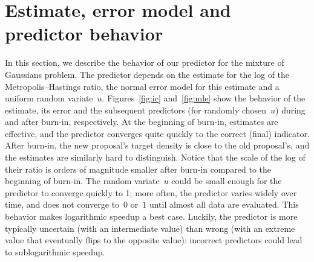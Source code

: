 \documentclass[angelino.tex]{subfiles}
\begin{document}
\section{Estimate, error model and predictor behavior}
\label{sec:predictor-behavior}

In this section, we describe the behavior of our predictor
for the mixture of Gaussians problem.
The predictor depends on the estimate for the log of the Metropolis--Hastings
ratio, the normal error model for this estimate and a uniform random variate~$u$.
Figures~\ref{fig:ic} and~\ref{fig:mle} show the behavior of the estimate,
its error and the subsequent predictors (for randomly chosen~$u$)
during and after burn-in, respectively.
%
At the beginning of burn-in, estimates are effective, and the predictor
converges quite quickly to the correct (final) indicator.
After burn-in, the new proposal's target density is close to the old proposal's,
and the estimates are similarly hard to distinguish.
%
Notice that the scale of the log of their ratio is orders of magnitude smaller
after burn-in compared to the beginning of burn-in.
The random variate~$u$ could be small enough for the predictor to
converge quickly to 1; more often, the predictor varies widely over time,
and does not converge to~$0$ or~$1$ until almost all data are evaluated.
This behavior makes logarithmic speedup a best case.
Luckily, the predictor is more typically uncertain (with an intermediate value)
than wrong (with an extreme value that eventually flips to the opposite value):
incorrect predictors could lead to sublogarithmic speedup.


\end{document}
